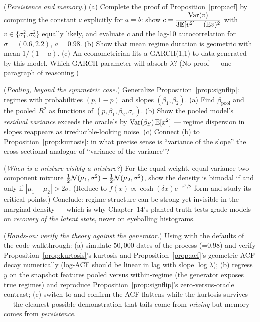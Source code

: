 \begin{exercise}\label{ex:2-acf}
(\emph{Persistence and memory.}) (a) Complete the proof of
Proposition~\ref{prop:acf} by computing the constant $c$ explicitly for
$a = b$: show
$c = \dfrac{\operatorname{Var}(v)}{3\mathbb{E}[v^2] - (\mathbb{E} v)^2}$ with
$v \in \{\sigma_1^2, \sigma_2^2\}$ equally likely, and evaluate $c$ and the
lag-10 autocorrelation for $\sigma = (0.6, 2.2)$, $a = 0.98$. (b) Show that
mean regime duration is geometric with mean $1/(1-a)$. (c) An
econometrician fits a GARCH(1,1) to data generated by this model. Which
GARCH parameter will absorb $\lambda$? (No proof --- one paragraph of
reasoning.)
\end{exercise}

\begin{exercise}\label{ex:2-pool}
(\emph{Pooling, beyond the symmetric case.}) Generalize
Proposition~\ref{prop:signflip}: regimes with probabilities $(p, 1{-}p)$
and slopes $(\beta_1, \beta_2)$. (a) Find $\beta_{\mathrm{pool}}$ and the
pooled $R^2$ as functions of $(p, \beta_1, \beta_2, \sigma_\varepsilon)$.
(b) Show the pooled model's \emph{residual variance} exceeds the oracle's by
$\operatorname{Var}(\beta_S)\,\mathbb{E}[x^2]$ --- regime dispersion in slopes reappears as
irreducible-looking noise. (c) Connect (b) to
Proposition~\ref{prop:kurtosis}: in what precise sense is ``variance of the
slope'' the cross-sectional analogue of ``variance of the variance''?
\end{exercise}

\begin{exercise}\label{ex:2-modes}
(\emph{When is a mixture visibly a mixture?}) For the equal-weight,
equal-variance two-component mixture
$\tfrac12\mathcal{N}(\mu_1, \sigma^2) + \tfrac12\mathcal{N}(\mu_2, \sigma^2)$, show
the density is bimodal if and only if $|\mu_1 - \mu_2| > 2\sigma$.
(Reduce to $f(x) \propto \cosh(\delta x)e^{-x^2/2}$ form and study its
critical points.) Conclude: regime structure can be strong yet invisible in
the marginal density --- which is why Chapter~14's planted-truth tests grade
models on \emph{recovery of the latent state}, never on eyeballing
histograms.
\end{exercise}

\begin{exercise}\label{ex:2-hands}
(\emph{Hands-on: verify the theory against the generator.}) Using
 with the defaults of the code walkthrough:
(a) simulate $50{,}000$ dates of the  process
(=0.98) and verify Proposition~\ref{prop:kurtosis}'s
kurtosis and Proposition~\ref{prop:acf}'s geometric ACF decay numerically
(log-ACF should be linear in lag with slope $\log\lambda$);
(b) regress $y$ on the snapshot features pooled versus within-regime (the
generator exposes true regimes) and reproduce
Proposition~\ref{prop:signflip}'s zero-versus-oracle contrast;
(c) switch to  and confirm the ACF flattens
while the kurtosis survives --- the cleanest possible demonstration that
tails come from \emph{mixing} but memory comes from \emph{persistence}.
\end{exercise}
